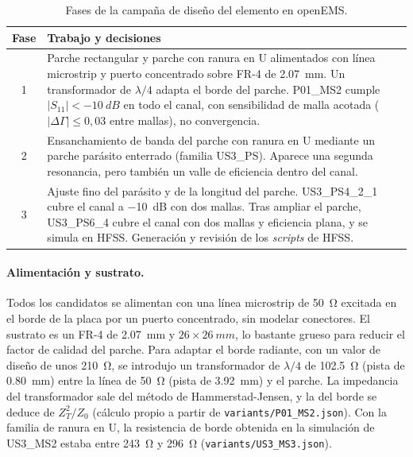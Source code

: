 \documentclass[11pt,a4paper]{article}
\begin{document}
\begin{table}[H]
    \centering
    \caption{Fases de la campaña de diseño del elemento en openEMS.}
    \label{tab:fases}
    \begin{tabularx}{\textwidth}{c X}
        \toprule
        Fase & Trabajo y decisiones \\
        \midrule
        1 & Parche rectangular y parche con ranura en U alimentados con línea microstrip y puerto
        concentrado sobre FR-4 de \SI{2.07}{mm}. Un transformador de $\lambda/4$ adapta el borde del
        parche. P01\_MS2 cumple $|S_{11}| < \SI{-10}{dB}$ en todo el canal, con sensibilidad de malla acotada ($|\Delta\Gamma| \le 0{,}03$ entre mallas), no convergencia. \\
        2 & Ensanchamiento de banda del parche con ranura en U mediante un
        parche parásito enterrado (familia US3\_PS). Aparece una segunda resonancia, pero también
        un valle de eficiencia dentro del canal. \\
        3 & Ajuste fino del parásito y de la longitud del parche. US3\_PS4\_2\_1
        cubre el canal a \SI{-10}{dB} con dos mallas. Tras ampliar el parche, US3\_PS6\_4 cubre el canal con
        dos mallas y eficiencia plana, y se simula en HFSS. Generación y revisión de los \textit{scripts} de HFSS. \\
        \bottomrule
    \end{tabularx}
\end{table}

\paragraph{Alimentación y sustrato.} Todos los candidatos se alimentan con una línea microstrip de
\SI{50}{\ohm} excitada en el borde de la placa por un puerto concentrado, sin modelar conectores.
El sustrato es un FR-4 de \SI{2.07}{mm} y $26 \times \SI{26}{mm}$, lo bastante grueso para reducir
el factor de calidad del parche. Para adaptar el borde radiante, con un valor de diseño de unos \SI{210}{\ohm}, se introdujo un
transformador de $\lambda/4$ de \SI{102.5}{\ohm} (pista de \SI{0.80}{mm}) entre la línea de \SI{50}{\ohm}
(pista de \SI{3.92}{mm}) y el parche. La impedancia del transformador sale del método de
Hammerstad-Jensen, y la del borde se deduce de $Z_T^2/Z_0$ (cálculo propio a partir de
\texttt{variants/P01\_MS2.json}). Con la familia de ranura en U, la resistencia de borde obtenida en la simulación de
US3\_MS2 estaba entre \SI{243}{\ohm} y \SI{296}{\ohm} (\texttt{variants/US3\_MS3.json}).
\end{document}
